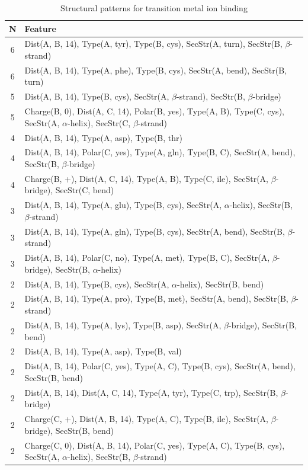 \documentclass[11pt,twoside,a4paper]{book}
\begin{document}
\begin{table}\begin{tabularx}{\textwidth}{cX}\textbf{N} & \textbf{Feature} \\ \hline  
6 & Dist(A, B, 14),  Type(A, tyr), Type(B, cys), SecStr(A, turn), SecStr(B, $\beta$-strand)\\ \hline 
6 & Dist(A, B, 14),  Type(A, phe), Type(B, cys), SecStr(A, bend), SecStr(B, turn)\\ \hline 
5 & Dist(A, B, 14),  Type(B, cys), SecStr(A, $\beta$-strand), SecStr(B, $\beta$-bridge)\\ \hline 
5 & Charge(B, 0), Dist(A, C, 14), Polar(B, yes),  Type(A, B), Type(C, cys), \newline SecStr(A, $\alpha$-helix), SecStr(C, $\beta$-strand)\\ \hline 
4 & Dist(A, B, 14),  Type(A, asp), Type(B, thr)\\ \hline 
4 & Dist(A, B, 14), Polar(C, yes),  Type(A, gln), Type(B, C), SecStr(A, bend), \newline SecStr(B, $\beta$-bridge)\\ \hline 
4 & Charge(B, +), Dist(A, C, 14),  Type(A, B), Type(C, ile), SecStr(A, $\beta$-bridge), \newline SecStr(C, bend)\\ \hline 
3 & Dist(A, B, 14),  Type(A, glu), Type(B, cys), SecStr(A, $\alpha$-helix), SecStr(B, $\beta$-strand)\\ \hline 
3 & Dist(A, B, 14),  Type(A, gln), Type(B, cys), SecStr(A, bend), \newline SecStr(B, $\beta$-strand)\\ \hline 
3 & Dist(A, B, 14), Polar(C, no),  Type(A, met), Type(B, C), SecStr(A, $\beta$-bridge), SecStr(B, $\alpha$-helix)\\ \hline 
2 & Dist(A, B, 14),  Type(B, cys), SecStr(A, $\alpha$-helix), SecStr(B, bend)\\ \hline 
2 & Dist(A, B, 14),  Type(A, pro), Type(B, met), SecStr(A, bend), SecStr(B, $\beta$-strand)\\ \hline 
2 & Dist(A, B, 14),  Type(A, lys), Type(B, asp), SecStr(A, $\beta$-bridge), SecStr(B, bend)\\ \hline 
2 & Dist(A, B, 14),  Type(A, asp), Type(B, val)\\ \hline 
2 & Dist(A, B, 14), Polar(C, yes),  Type(A, C), Type(B, cys), SecStr(A, bend), \newline SecStr(B, bend)\\ \hline 
2 & Dist(A, B, 14), Dist(A, C, 14),  Type(A, tyr), Type(C, trp), SecStr(B, $\beta$-bridge)\\ \hline 
2 & Charge(C, +), Dist(A, B, 14),  Type(A, C), Type(B, ile), SecStr(A, $\beta$-bridge), \newline SecStr(B, bend)\\ \hline 
2 & Charge(C, 0), Dist(A, B, 14), Polar(C, yes),  Type(A, C), Type(B, cys), \newline SecStr(A, $\alpha$-helix), SecStr(B, $\beta$-strand)\\ \hline 
 \end{tabularx}\caption{Structural patterns for transition metal ion binding}\label{tab:transition_metal_ion_binding}\end{table}
\end{document}
